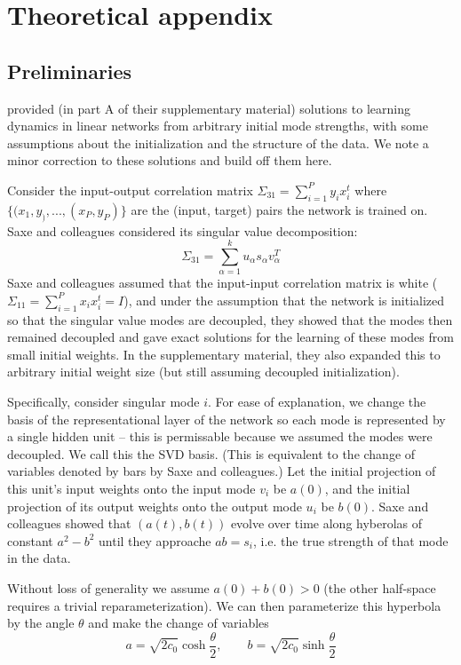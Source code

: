 \documentclass{article}
\begin{document}
\section{Theoretical appendix}
\subsection{Preliminaries}
\citet{Saxe2014} provided (in part A of their supplementary material) solutions to learning dynamics in linear networks from arbitrary initial mode strengths, with some assumptions about the initialization and the structure of the data. We note a minor correction to these solutions and build off them here. \par
Consider the input-output correlation matrix $\Sigma_{31} = \sum_{i=1}^P y_ix_i^t$ where $\{(x_1, y_), ..., (x_P, y_P)\}$ are the (input, target) pairs the network is trained on. Saxe and colleagues considered its singular value decomposition:
$$\Sigma_{31} = \sum_{\alpha=1}^{k} u_\alpha s_\alpha v_\alpha^T$$
Saxe and colleagues assumed that the input-input correlation matrix is white ($\Sigma_11 = \sum_{i=1}^P x_i x_i^t = I$), and under the assumption that the network is initialized so that the singular value modes are decoupled, they showed that the modes then remained decoupled and gave exact solutions for the learning of these modes from small initial weights. In the supplementary material, they also expanded this to arbitrary initial weight size (but still assuming decoupled initialization). \par
Specifically, consider singular mode $i$. For ease of explanation, we change the basis of the representational layer of the network so each mode is represented by a single hidden unit -- this is permissable because we assumed the modes were decoupled. We call this the SVD basis. (This is equivalent to the change of variables denoted by bars by Saxe and colleagues.) Let the initial projection of this unit's input weights onto the input mode $v_i$ be $a(0)$, and the initial projection of its output weights onto the output mode $u_i$ be $b(0)$. Saxe and colleagues showed that $(a(t), b(t))$ evolve over time along hyberolas of constant $a^2-b^2$ until they approache $ab = s_i$, i.e. the true strength of that mode in the data. \par
Without loss of generality we assume $a(0) + b(0) > 0$ (the other half-space requires a trivial reparameterization). We can then parameterize this hyperbola by the angle $\theta$ and make the change of variables
$$a = \sqrt{2c_0} \cosh \frac{\theta}{2}, \qquad b = \sqrt{2c_0} \sinh \frac{\theta}{2}$$
\end{document}
